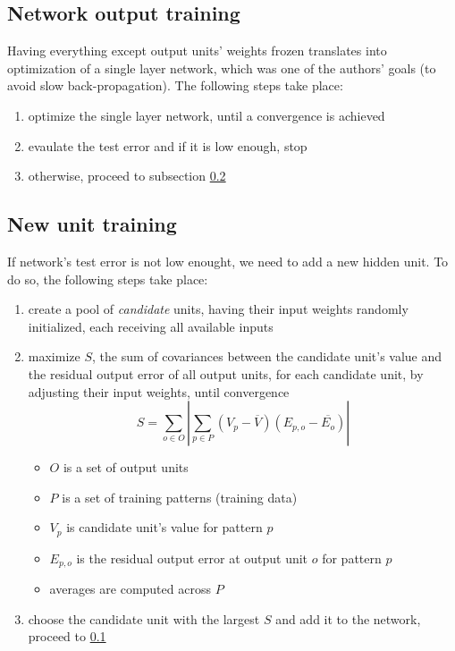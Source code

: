 \documentclass[a4paper,twocolumn]{article}
\newcommand*\mean[1]{\overline{#1}}
\begin{document}
\subsection{Network output training} \label{ssec:nn}
Having everything except output units' weights frozen translates into optimization of a single layer network, which was one of the authors' goals (to avoid slow back-propagation). The following steps take place:
\begin{enumerate}
    \item optimize the single layer network, until a convergence is achieved
    \item evaulate the test error and if it is low enough, stop
    \item otherwise, proceed to subsection \ref{ssec:unit}
\end{enumerate}

\subsection{New unit training} \label{ssec:unit}
If network's test error is not low enought, we need to add a new hidden unit. To do so, the following steps take place:
\begin{enumerate}
    \item create a pool of \textit{candidate} units, having their input weights randomly initialized, each receiving all available inputs
    \item maximize $S$, the sum of covariances between the candidate unit's value and the residual output error of all output units, for each candidate unit, by adjusting their input weights, until convergence
\[
    S = \sum_{o \in O} \left| \sum_{p \in P} (V_p - \mean{V})(E_{p,o} - \mean{E_o}) \right|
\]
    \begin{itemize}
        \item $O$ is a set of output units
        \item $P$ is a set of training patterns (training data)
        \item $V_p$ is candidate unit's value for pattern $p$
        \item $E_{p,o}$ is the residual output error at output unit $o$ for pattern $p$
        \item averages are computed across $P$
    \end{itemize}

    \item choose the candidate unit with the largest $S$ and add it to the network, proceed to \ref{ssec:nn}
\end{enumerate}
\end{document}
